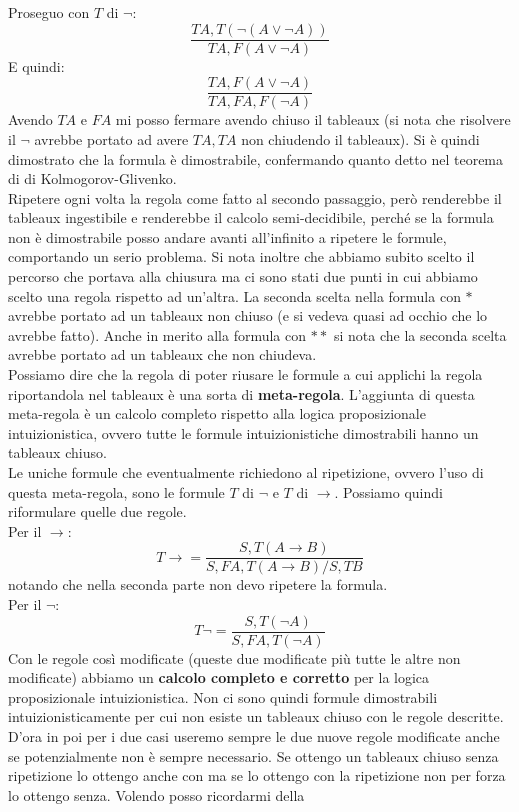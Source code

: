 \documentclass[a4paper,12pt, oneside]{book}
\begin{document}
Proseguo con $T$ di $\neg$:
\[\frac{TA, T(\neg (A\lor\neg A))}{TA, F(A\lor\neg A)}\]
E quindi:
\[\frac{TA, F(A\lor\neg A)}{TA, FA, F(\neg A)}\]
Avendo $TA$ e $FA$ mi posso fermare avendo chiuso il tableaux (si nota che
risolvere il $\neg$ avrebbe portato ad avere $TA,TA$ non chiudendo il
tableaux). Si è quindi dimostrato che la formula è dimostrabile, confermando
quanto detto nel teorema di di Kolmogorov-Glivenko.\\
Ripetere ogni volta la regola come fatto al secondo passaggio, però renderebbe
il tableaux ingestibile e renderebbe il calcolo semi-decidibile, perché se la
formula non è dimostrabile posso andare avanti all'infinito a ripetere le
formule, comportando un serio problema. Si nota inoltre che abbiamo subito
scelto il percorso che portava alla chiusura ma ci sono stati due punti in cui
abbiamo scelto una regola rispetto ad un'altra. La seconda scelta nella formula
con $*$ avrebbe portato ad un tableaux non chiuso (e si vedeva quasi ad occhio
che lo avrebbe fatto). Anche in merito alla formula con $**$ si nota che la
seconda scelta avrebbe portato ad un tableaux che non chiudeva. \\
Possiamo dire che la regola di poter riusare le formule a cui applichi la regola
riportandola nel tableaux è una sorta di \textbf{meta-regola}. L'aggiunta di
questa meta-regola è un calcolo completo rispetto alla logica proposizionale
intuizionistica, ovvero tutte le formule intuizionistiche dimostrabili hanno un
tableaux chiuso.\\
Le uniche formule che eventualmente richiedono al ripetizione, ovvero l'uso di
questa meta-regola, sono le formule $T$ di $\neg$ e $T$ di $\to$. Possiamo
quindi riformulare quelle due regole.\\
Per il $\to$:
\[T\to=\frac{S,T(A\to B)}{S,FA,T(A\to B)/S,TB}\]
notando che nella seconda parte non devo ripetere la formula.\\
Per il $\neg$:
\[T\neg=\frac{S,T(\neg A)}{S,FA,T(\neg A)}\]
Con le regole così modificate (queste due modificate più tutte le altre non
modificate) abbiamo un \textbf{calcolo completo e corretto} per la 
logica proposizionale intuizionistica. Non ci sono quindi formule dimostrabili
intuizionisticamente per cui non esiste un tableaux chiuso con le regole
descritte. D'ora in poi per i due casi useremo sempre le due nuove regole
modificate anche se potenzialmente non è sempre necessario. Se ottengo un
tableaux chiuso senza ripetizione lo ottengo anche con ma se lo ottengo con la
ripetizione non per forza lo ottengo senza. Volendo posso ricordarmi della
\end{document}
